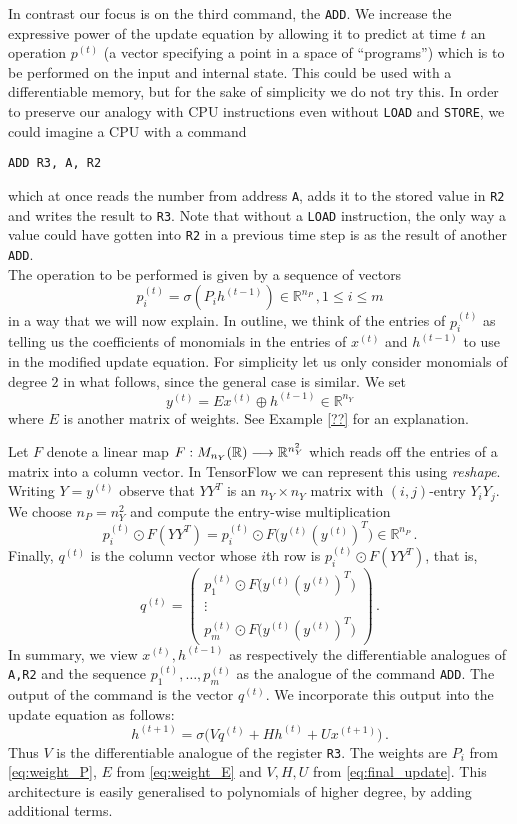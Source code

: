 \documentclass[english,letter paper,12pt,leqno]{article}
\theoremstyle{example}
\numberwithin{equation}{section}
\def\be{\begin{equation}}
\def\ee{\end{equation}}
\begin{document}
In contrast our focus is on the third command, the \verb+ADD+. We increase the expressive power of the update equation by allowing it to predict at time $t$ an operation $p^{(t)}$ (a vector specifying a point in a space of ``programs'') which is to be performed on the input and internal state. This could be used with a differentiable memory, but for the sake of simplicity we do not try this. In order to preserve our analogy with CPU instructions even without \verb+LOAD+ and \verb+STORE+, we could imagine a CPU with a command
\begin{verbatim}
ADD R3, A, R2
\end{verbatim}
which at once reads the number from address \verb+A+, adds it to the stored value in \verb+R2+ and writes the result to \verb+R3+. Note that without a \verb+LOAD+ instruction, the only way a value could have gotten into \verb+R2+ in a previous time step is as the result of another \verb+ADD+.
\\

The operation to be performed is given by a sequence of vectors
\be\label{eq:weight_P}
p^{(t)}_i = \sigma( P_i h^{(t-1)} ) \in \mathbb{R}^{n_P}\,, 1 \le i \le m
\ee
in a way that we will now explain. In outline, we think of the entries of $p^{(t)}_i$ as telling us the coefficients of monomials in the entries of $x^{(t)}$ and $h^{(t-1)}$ to use in the modified update equation. For simplicity let us only consider monomials of degree $2$ in what follows, since the general case is similar. We set
\be\label{eq:weight_E}
y^{(t)} = E x^{(t)} \oplus h^{(t-1)} \in \mathbb{R}^{n_Y}
\ee
where $E$ is another matrix of weights. See Example \ref{??} for an explanation.

Let $F$ denote a linear map $F: M_{n_Y}(\mathbb{R}) \longrightarrow \mathbb{R}^{n_Y^2}$ which reads off the entries of a matrix into a column vector. In TensorFlow we can represent this using \emph{reshape}. Writing $Y = y^{(t)}$ observe that $Y Y^T$ is an $n_Y \times n_Y$ matrix with $(i,j)$-entry $Y_i Y_j$. We choose $n_P = n_Y^2$ and compute the entry-wise multiplication
\[
p^{(t)}_i \odot F(Y Y^T) = p^{(t)}_i \odot F\big( y^{(t)} ( y^{(t)} )^T \big) \in \mathbb{R}^{n_P}\,.
\]
Finally, $q^{(t)}$ is the column vector whose $i$th row is $p^{(t)}_i \odot F(Y Y^T)$, that is,
\[
q^{(t)} = \begin{pmatrix} p^{(t)}_1 \odot F\big( y^{(t)} ( y^{(t)} )^T \big) \\
\vdots\\
p^{(t)}_m \odot F\big( y^{(t)} ( y^{(t)} )^T \big) \end{pmatrix}\,.
\] 
In summary, we view $x^{(t)}, h^{(t-1)}$ as respectively the differentiable analogues of \verb+A,R2+ and the sequence $p^{(t)}_1, \ldots, p^{(t)}_m$ as the analogue of the command \verb+ADD+. The output of the command is the vector $q^{(t)}$. We incorporate this output into the update equation as follows:
\be\label{eq:final_update}
h^{(t+1)} = \sigma\big( V q^{(t)} + H h^{(t)} + U x^{(t+1)} \big)\,.
\ee
Thus $V$ is the differentiable analogue of the register \verb+R3+. The weights are $P_i$ from \eqref{eq:weight_P}, $E$ from \eqref{eq:weight_E} and $V, H, U$ from \eqref{eq:final_update}. This architecture is easily generalised to polynomials of higher degree, by adding additional terms.
\end{document}
